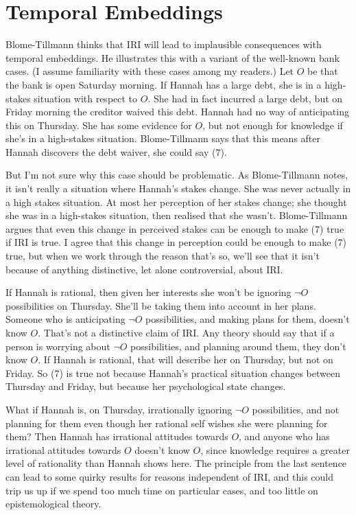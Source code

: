\section{Temporal Embeddings}
\noindent Blome-Tillmann thinks that IRI will lead to implausible consequences with temporal embeddings. He illustrates this with a variant of the well-known bank cases. (I assume familiarity with these cases among my readers.) Let $O$ be that the bank is open Saturday morning. If Hannah has a large debt, she is in a high-stakes situation with respect to $O$. She had in fact incurred a large debt, but on Friday morning the creditor waived this debt. Hannah had no way of anticipating this on Thursday. She has some evidence for $O$, but not enough for knowledge if she's in a high-stakes situation. Blome-Tillmann says that this means after Hannah discovers the debt waiver, she could say (7).


\noindent But I'm not sure why this case should be problematic. As Blome-Tillmann notes, it isn't really a situation where Hannah's stakes change. She was never actually in a high stakes situation. At most her perception of her stakes change; she thought she was in a high-stakes situation, then realised that she wasn't. Blome-Tillmann argues that even this change in perceived stakes can be enough to make (7) true if IRI is true. I agree that this change in perception could be enough to make (7) true, but when we work through the reason that's so, we'll see that it isn't because of anything distinctive, let alone controversial, about IRI.

If Hannah is rational, then given her interests she won't be ignoring $\neg O$ possibilities on Thursday. She'll be taking them into account in her plans. Someone who is anticipating $\neg O$ possibilities, and making plans for them, doesn't know $O$. That's not a distinctive claim of IRI. Any theory should say that if a person is worrying about $\neg O$ possibilities, and planning around them, they don't know $O$. If Hannah is rational, that will describe her on Thursday, but not on Friday. So (7) is true not because Hannah's practical situation changes between Thursday and Friday, but because her psychological state changes.

What if Hannah is, on Thursday, irrationally ignoring $\neg O$ possibilities, and not planning for them even though her rational self wishes she were planning for them? Then Hannah has irrational attitudes towards $O$, and anyone who has irrational attitudes towards $O$ doesn't know $O$, since knowledge requires a greater level of rationality than Hannah shows here. The principle from the last sentence can lead to some quirky results for reasons independent of IRI, and this could trip us up if we spend too much time on particular cases, and too little on epistemological theory. 

